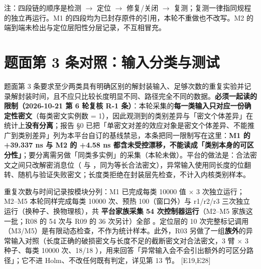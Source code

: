 \documentclass[UTF8,fontset=fandol,11pt,a4paper]{ctexart}
\begin{document}
\begin{landscape}
\begin{longtable}
\end{longtable}
\noindent 注：四段链的顺序是检测 \texorpdfstring{$\rightarrow$}{->} 定位 \texorpdfstring{$\rightarrow$}{->} 修复/关闭 \texorpdfstring{$\rightarrow$}{->} 复测；复测一律指同规程的独立再运行。M1 的四段均为已封存原件的引用，本轮不重做也不改写。M2 的端到端未检出与定位层阳性分层记录，不互相冒充。\par\endgroup\vspace{3mm}\end{landscape}
\section{题面第 3 条对照：输入分类与测试}
题面第 3 条要求至少两类具有明确区别的解封装输入、足够次数的重复实验并记录解封装时间，且不应只比较长度明显不同、路径完全不同的数据。\textbf{必须一起读的限制（2026-10-21 第 6 轮复核 R-1 条）}：本轮采集的\textbf{每一类输入只对应一份确定性密文}（每类密文实例数 = 1），因此观测到的类别差异与「密文个体差异」在统计上\textbf{没有分离}；报告 §0 已把「单密文对差的效应对象是密文个体差异、不能推广到类别差异」列为本平台自订的基线禁忌，本条把同一限制写在这里：\textbf{M1 的 +39.337 ns 与 M2 的 +4.58 ns 都含未受控漂移，不能读成「类别本身的可区分性」}；要分离需另做「同类多实例」的采集（本轮未做）。平台的做法是：合法密文之间只改解密消息位（\texttt{} 与 \texttt{}，同为等长合法密文），异常输入使用同长度的位翻转、随机与验证失败密文；长度类拒绝在封装层先检查，不计入内核类别样本。


重复次数与时间记录按模块分列：M1 已完成每类 10000 值 \texorpdfstring{$\times$}{x} 3 次独立运行；M2–M5 本轮同样完成每类 10000 次、预热 100（窗口外）与 r1/r2/r3 三次独立运行（换种子、换物理核），共 \textbf{平台家族采集 54 次控制器运行}（M2–M5 家族这一批；R08 的 54 次与 R09 的 36 次另计）全部 \texttt{}。定位层的 10 次完整标记调用（M3/M5）是有限动态检查，不作为统计样本。此外，R03 另做了一组\textbf{族外}的异常输入对照（长度正确的破损密文与长度不足的截断密文对合法密文，3 臂 \texorpdfstring{$\times$}{x} 3 种子、每类 10000 次、18/18 \texttt{}），用来回答「异常输入会不会引出额外的可区分路径」；它不进 Holm、不改任何既有判定，详见第 13 节。 [E19,E28]
\end{document}
